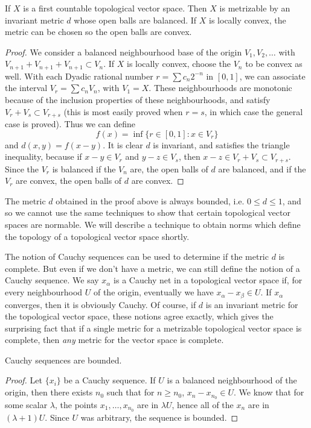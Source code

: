 \begin{theorem}
    If $X$ is a first countable topological vector space. Then $X$ is metrizable by an invariant metric $d$ whose open balls are balanced. If $X$ is locally convex, the metric can be chosen so the open balls are convex.
\end{theorem}
\begin{proof}
    We consider a balanced neighbourhood base of the origin $V_1, V_2, \dots$ with $V_{n+1} + V_{n+1} + V_{n+1} \subset V_n$. If $X$ is locally convex, choose the $V_n$ to be convex as well. With each Dyadic rational number $r = \sum c_n 2^{-n}$ in $[0,1]$, we can associate the interval $V_r = \sum c_n V_n$, with $V_1 = X$. These neighbourhoods are monotonic because of the inclusion properties of these neighbourhoods, and satisfy $V_r + V_s \subset V_{r+s}$ (this is most easily proved when $r = s$, in which case the general case is proved). Thus we can define
    \[ f(x) = \inf \{ r \in [0,1] : x \in V_r \} \]
    and $d(x,y) = f(x-y)$. It is clear $d$ is invariant, and satisfies the triangle inequality, because if $x - y \in V_r$ and $y - z \in V_s$, then $x - z \in V_r + V_s \subset V_{r + s}$. Since the $V_r$ is balanced if the $V_n$ are, the open balls of $d$ are balanced, and if the $V_r$ are convex, the open balls of $d$ are convex.
\end{proof}

\begin{remark}
    The metric $d$ obtained in the proof above is always bounded, i.e. $0 \leq d \leq 1$, and so we cannot use the same techniques to show that certain topological vector spaces are normable. We will describe a technique to obtain norms which define the topology of a topological vector space shortly.
\end{remark}

The notion of Cauchy sequences can be used to determine if the metric $d$ is complete. But even if we don't have a metric, we can still define the notion of a Cauchy sequence. We say $x_\alpha$ is a Cauchy net in a topological vector space if, for every neighbourhood $U$ of the origin, eventually we have $x_\alpha - x_\beta \in U$. If $x_\alpha$ converges, then it is obviously Cauchy. Of course, if $d$ is an invariant metric for the topological vector space, these notions agree exactly, which gives the surprising fact that if a single metric for a metrizable topological vector space is complete, then {\it any} metric for the vector space is complete.

\begin{theorem}
    Cauchy sequences are bounded.
\end{theorem}
\begin{proof}
    Let $\{ x_i \}$ be a Cauchy sequence. If $U$ is a balanced neighbourhood of the origin, then there exists $n_0$ such that for $n \geq n_0$, $x_n - x_{n_0} \in U$. We know that for some scalar $\lambda$, the points $x_1, \dots, x_{n_0}$ are in $\lambda U$, hence all of the $x_n$ are in $(\lambda + 1)U$. Since $U$ was arbitrary, the sequence is bounded.
\end{proof}

